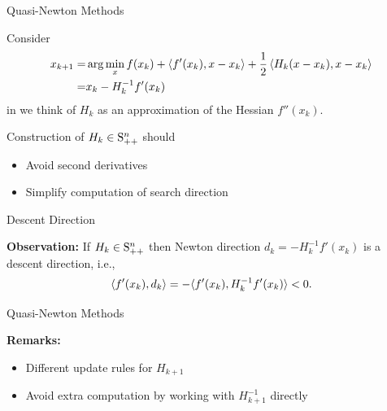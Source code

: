 \documentclass[9pt]{beamer}
\begin{document}
\begin{frame}{Quasi-Newton Methods}

  Consider
  \begin{align*}
    x_{k+1 } = & \arg \min_{x} f(x_k) + \iprod{f'(x_k)}{x-x_k} + \frac{1}{2} \iprod{H_k(x - x_k)}{x - x_k} \\
     = & x_k - H_k^{-1}  f'(x_k)
  \end{align*}
  in we think of $H_k$ as an approximation of the Hessian $f''(x_k)$.

  \vfill

  Construction of $H_k\in \S^n_{++}$ should
  \begin{itemize}
  \item Avoid second derivatives
  \item Simplify computation of search direction
  \end{itemize}  
  
\end{frame}

\begin{frame}{Descent Direction}

  \textbf{Observation:} If $H_{k}\in \S^n_{++}$ then Newton direction $d_{k} = -H_k^{-1}f'(x_k)$ is a descent direction, i.e.,
  \[
    \iprod{f'(x_k)}{d_k} = -\langle f'(x_k), H_k^{-1}f'(x_k)\rangle < 0.
  \]


\end{frame}

\begin{frame}{Quasi-Newton Methods}

  \begin{algorithm}[H]
    \caption{\emph{Quasi-Newton Method}}
  \end{algorithm}

  \vfill
  
  \textbf{Remarks:}
  \begin{itemize}
  \item Different update rules for $H_{k+1}$
  \item Avoid extra computation by working with $H_{k+1}^{-1}$ directly
  \end{itemize}
\end{frame}
\end{document}
